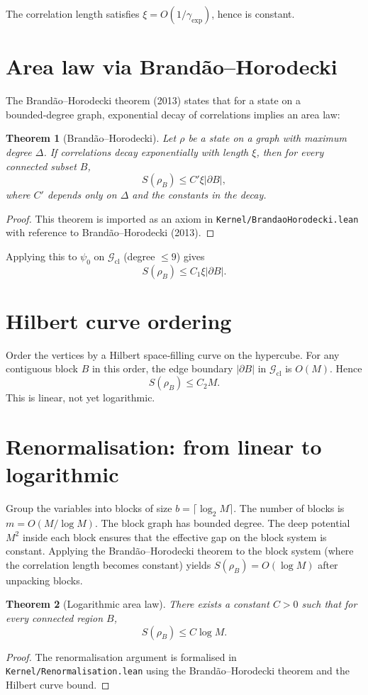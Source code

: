 \documentclass[11pt,a4paper]{article}
\newtheorem{theorem}{Theorem}[section]
\begin{document}
The correlation length satisfies $\xi = O(1/\gamma_{\mathrm{exp}})$, hence is constant.

\section{Area law via Brandão–Horodecki}
The Brandão–Horodecki theorem (2013) states that for a state on a bounded‑degree graph, exponential decay of correlations implies an area law:

\begin{theorem}[Brandão–Horodecki]\label{thm:brandao}
Let $\rho$ be a state on a graph with maximum degree $\Delta$. If correlations decay exponentially with length $\xi$, then for every connected subset $B$,
\[
S(\rho_B) \le C' \xi |\partial B|,
\]
where $C'$ depends only on $\Delta$ and the constants in the decay.
\end{theorem}
\begin{proof}
This theorem is imported as an axiom in \texttt{Kernel/BrandaoHorodecki.lean} with reference to Brandão–Horodecki (2013).
\end{proof}

Applying this to $\psi_0$ on $\mathcal{G}_{\mathrm{cl}}$ (degree $\le 9$) gives
\[
S(\rho_B) \le C_1 \xi |\partial B|.
\]

\section{Hilbert curve ordering}
Order the vertices by a Hilbert space‑filling curve on the hypercube. For any contiguous block $B$ in this order, the edge boundary $|\partial B|$ in $\mathcal{G}_{\mathrm{cl}}$ is $O(M)$. Hence
\[
S(\rho_B) \le C_2 M.
\]
This is linear, not yet logarithmic.

\section{Renormalisation: from linear to logarithmic}
Group the variables into blocks of size $b = \lceil \log_2 M\rceil$. The number of blocks is $m = O(M/\log M)$. The block graph has bounded degree. The deep potential $M^2$ inside each block ensures that the effective gap on the block system is constant. Applying the Brandão–Horodecki theorem to the block system (where the correlation length becomes constant) yields $S(\rho_B) = O(\log M)$ after unpacking blocks.

\begin{theorem}[Logarithmic area law]\label{thm:log}
There exists a constant $C > 0$ such that for every connected region $B$,
\[
S(\rho_B) \le C \log M.
\]
\end{theorem}
\begin{proof}
The renormalisation argument is formalised in \texttt{Kernel/Renormalisation.lean} using the Brandão–Horodecki theorem and the Hilbert curve bound.
\end{proof}
\end{document}
